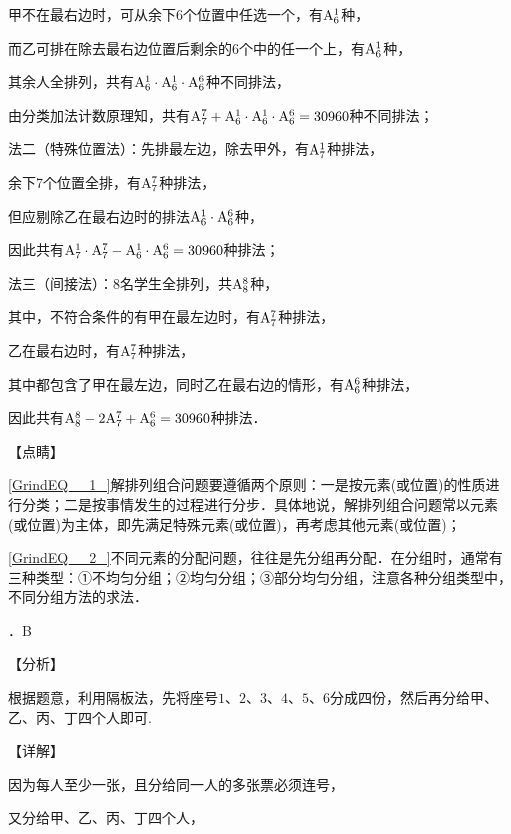 \noindent 甲不在最右边时，可从余下6个位置中任选一个，有${\rm A}_{6}^{1} $种，

\noindent 而乙可排在除去最右边位置后剩余的6个中的任一个上，有${\rm A}_{6}^{1} $种，

\noindent 其余人全排列，共有${\rm A}_{6}^{1} \cdot {\rm A}_{6}^{1} \cdot {\rm A}_{6}^{6} $种不同排法，

\noindent 由分类加法计数原理知，共有${\rm A}_{7}^{7} +{\rm A}_{6}^{1} \cdot {\rm A}_{6}^{1} \cdot {\rm A}_{6}^{6} =30960$种不同排法；

\noindent 法二（特殊位置法）：先排最左边，除去甲外，有${\rm A}_{7}^{1} $种排法，

\noindent 余下7个位置全排，有${\rm A}_{7}^{7} $种排法，

\noindent 但应剔除乙在最右边时的排法${\rm A}_{6}^{1} \cdot {\rm A}_{6}^{6} $种，

\noindent 因此共有${\rm A}_{7}^{1} \cdot {\rm A}_{7}^{7} -{\rm A}_{6}^{1} \cdot {\rm A}_{6}^{6} =30960$种排法；

\noindent 法三（间接法）：8名学生全排列，共${\rm A}_{8}^{8} $种，

\noindent 其中，不符合条件的有甲在最左边时，有${\rm A}_{7}^{7} $种排法，

\noindent 乙在最右边时，有${\rm A}_{7}^{7} $种排法，

\noindent 其中都包含了甲在最左边，同时乙在最右边的情形，有${\rm A}_{6}^{6} $种排法，

\noindent 因此共有${\rm A}_{8}^{8} -2{\rm A}_{7}^{7} +{\rm A}_{6}^{6} =30960$种排法．

\noindent 【点睛】

\noindent \eqref{GrindEQ__1_}解排列组合问题要遵循两个原则：一是按元素(或位置)的性质进行分类；二是按事情发生的过程进行分步．具体地说，解排列组合问题常以元素(或位置)为主体，即先满足特殊元素(或位置)，再考虑其他元素(或位置)；

\noindent \eqref{GrindEQ__2_}不同元素的分配问题，往往是先分组再分配．在分组时，通常有三种类型：①不均匀分组；②均匀分组；③部分均匀分组，注意各种分组类型中，不同分组方法的求法．

．B

\noindent 【分析】

\noindent 根据题意，利用隔板法，先将座号$1$、$2$、$3$、$4$、$5$、$6$分成四份，然后再分给甲、乙、丙、丁四个人即可.

\noindent 【详解】

\noindent 因为每人至少一张，且分给同一人的多张票必须连号，

\noindent 又分给甲、乙、丙、丁四个人，

